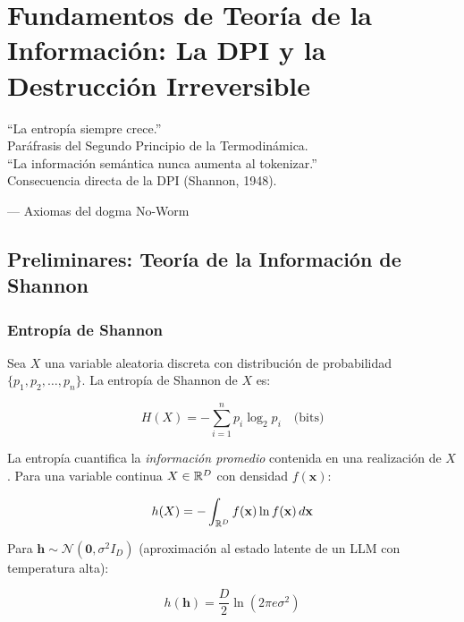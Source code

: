 \chapter{Fundamentos de Teoría de la Información: La DPI y la Destrucción Irreversible}
\label{ch:dpi}

\epigraph{``La entropía siempre crece.''\\
Paráfrasis del Segundo Principio de la Termodinámica.\\[0.3cm]
``La información semántica nunca aumenta al tokenizar.''\\
Consecuencia directa de la DPI (Shannon, 1948).}{--- Axiomas del dogma No-Worm}

\section{Preliminares: Teoría de la Información de Shannon}

\subsection{Entropía de Shannon}

Sea $X$ una variable aleatoria discreta con distribución de probabilidad
$\{p_1, p_2, \ldots, p_n\}$. La entropía de Shannon de $X$ es:

\begin{equation}
H(X) = -\sum_{i=1}^{n} p_i \log_2 p_i \quad \text{(bits)}
\label{eq:shannon_entropy}
\end{equation}

La entropía cuantifica la \textit{información promedio} contenida en una realización
de $X$. Para una variable continua $X \in \mathbb{R}^D$ con densidad $f(\mathbf{x})$:

\begin{equation}
h(X) = -\int_{\mathbb{R}^D} f(\mathbf{x}) \ln f(\mathbf{x}) \, d\mathbf{x}
\label{eq:differential_entropy}
\end{equation}

Para $\mathbf{h} \sim \mathcal{N}(\mathbf{0}, \sigma^2 I_D)$ (aproximación al
estado latente de un LLM con temperatura alta):

\begin{equation}
h(\mathbf{h}) = \frac{D}{2} \ln(2\pi e \sigma^2)
\end{equation}

